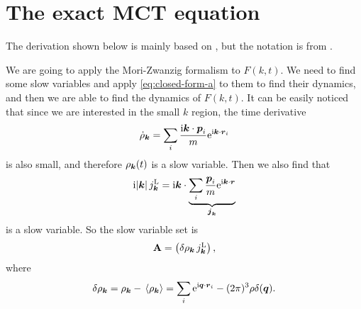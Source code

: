 \documentclass[hyperref, a4paper]{article}
\newcommand*{\ii}{\mathrm{i}}
\newcommand*{\ee}{\mathrm{e}}
\def\\{}%
\begin{document}
\section{The exact MCT equation} 

The derivation shown below is mainly based on \cite{mct2005}, but the notation is from \cite{RevModPhys.76.785}. 

We are going to apply the Mori-Zwanzig formalism to $F(k, t)$. We need to find some slow variables
and apply \eqref{eq:closed-form-a} to them to find their dynamics, and then we are able to find the dynamics 
of $F(k, t)$. It can be easily noticed that since we are interested in the small $k$ region, the time derivative 
\[
    \dot{\rho}_{\vb*{k}} = \sum_i \frac{\ii \vb*{k} \cdot \vb*{p}_i}{m} \ee^{\ii \vb*{k} \cdot \vb*{r}_i }
\]
is also small, and therefore $\rho_{\vb*{k}}(t)$ is a slow variable. Then we also find that 
\[
    \ii \abs*{\vb*{k}} j_{\vb*{k}}^\text{L} = \ii \vb*{k} \cdot 
    \underbrace{\sum_{i} \frac{\vb*{p}_i}{m} \ee^{\ii \vb*{k} \cdot \vb*{r}}}_{\vb*{j}_{\vb*{k}}}
\]
is a slow variable. So the slow variable set is 
\begin{equation}
    \vb{A} = \pmqty{\var{\rho_{\vb*{k}}} \\ j_{\vb*{k}}^\text{L}},  
\end{equation}
where 
\begin{equation}
    \var{\rho_{\vb*{k}}} = \rho_{\vb*{k}} - \expval*{\rho_{\vb*{k}}} 
    = \sum_{i} \ee^{\ii \vb*{q} \cdot \vb*{r}_i} - (2\pi)^3 \rho \delta(\vb*{q}).
\end{equation}
\end{document}
